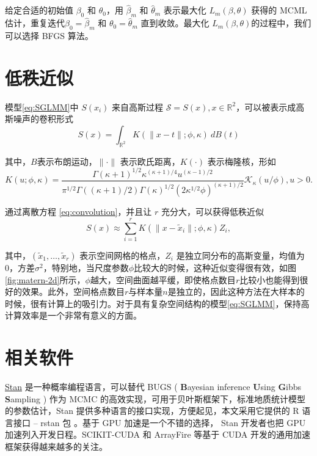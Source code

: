 \documentclass[hyperref, a4paper, UTF8, zihao = -4, linespread = 1.25, scheme = chinese]{ctexbook}
\begin{document}
给定合适的初始值 \(\beta_{0}\) 和 \(\theta_{0}\)，用 \(\hat{\beta}_{m}\)
和 \(\hat{\theta}_{m}\) 表示最大化 \(L_{m}(\beta,\theta)\) 获得的 MCML
估计，重复迭代\(\beta_{0}=\hat{\beta}_{m}\) 和
\(\theta_{0}=\hat{\theta}_{m}\) 直到收敛。最大化
\(L_{m}(\beta,\theta)\)的过程中，我们可以选择 BFGS 算法。

\hypertarget{low-rank}{%
\section{低秩近似}\label{low-rank}}

模型\eqref{eq:SGLMM}中 \(S(x_i)\) 来自高斯过程
\(\mathcal{S} = S(x),x\in \mathbb{R}^2\)，可以被表示成高斯噪声的卷积形式\begin{equation}
S(x) = \int_{\mathbb{R}^2} K(\|x-t\|; \phi, \kappa) \: d B(t) \label{eq:convolution}
\end{equation}

其中，\(B\)表示布朗运动，\(\|\cdot\|\) 表示欧氏距离，\(K(\cdot)\)
表示梅隆核，形如\begin{equation}
K(u; \phi, \kappa) = \frac{\Gamma(\kappa + 1)^{1/2}\kappa^{(\kappa+1)/4}u^{(\kappa-1)/2}}{\pi^{1/2}\Gamma((\kappa+1)/2)\Gamma(\kappa)^{1/2}(2\kappa^{1/2}\phi)^{(\kappa+1)/2}}\mathcal{K}_{\kappa}(u/\phi), u > 0. \label{eq:matern-kernel}
\end{equation}

通过离散方程 \eqref{eq:convolution}，并且让 \(r\)
充分大，可以获得低秩近似\begin{equation}
S(x) \approx \sum_{i = 1}^r K(\|x-\tilde{x}_{i}\|; \phi, \kappa) Z_{i}, \label{eq:lr-approx}
\end{equation}

其中，\((\tilde{x}_{1},\ldots,\tilde{x}_{r})\)
表示空间网格的格点，\(Z_{i}\)
是独立同分布的高斯变量，均值为0，方差\(\sigma^2\)，特别地，当尺度参数\(\phi\)比较大的时候，这种近似变得很有效，如图\ref{fig:matern-2d}所示，\(\phi\)越大，空间曲面越平缓，即使格点数目\(r\)比较小也能得到很好的效果。此外，空间格点数目\(r\)与样本量\(n\)是独立的，因此这种方法在大样本的时候，很有计算上的吸引力。对于具有复杂空间结构的模型\eqref{eq:SGLMM}，保持高计算效率是一个非常有意义的方面。

\section{相关软件}

\href{http://mc-stan.org/}{Stan}
是一种概率编程语言\citep{Stan2017JSS}，可以替代 BUGS ( \textbf{B}ayesian
inference \textbf{U}sing \textbf{G}ibbs \textbf{S}ampling ) \citep{BUGS}
作为 MCMC
的高效实现，可用于贝叶斯框架下，标准地质统计模型的参数估计，Stan
提供多种语言的接口实现，方便起见，本文采用它提供的 R 语言接口 -- rstan
包 \citep{RStan}。基于 GPU 加速是一个不错的选择， Stan 开发者也把 GPU
加速列入开发日程。SCIKIT-CUDA \citep{scikitcuda2015} 和 ArrayFire
\citep{ArrayFire2015} 等基于 CUDA 开发的通用加速框架获得越来越多的关注。
\end{document}
